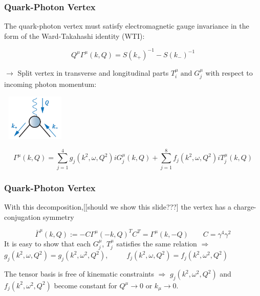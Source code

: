 \begin{frame}\frametitle{Quark-Photon Vertex}
The quark-photon vertex must satisfy electromagnetic gauge invariance in the form of the
Ward-Takahashi identity (WTI):

\begin{equation}
	Q^\mu\Gamma^\mu(k, Q)=S(k_+)^{-1}-S(k_-)^{-1}
\end{equation}

\begin{minipage}[r]{0.65\textwidth}
	$\rightarrow$ Split vertex in transverse and longitudinal parts $T_i^{\mu} \; \text{and} \; G_j^{\mu} $ with respect to incoming photon momentum:
\end{minipage}
\begin{minipage}[r]{0.30\textwidth}
	\hspace{2mm}
	\includegraphics[height=2.2cm, width=3.2cm]{Vertex.png}
\end{minipage}

\begin{equation}
	\Gamma^\mu(k,Q)=\sum_{j=1}^4 g_j(k^2, \omega, Q^2)iG^\mu_j(k, Q)+\sum_{j=1}^8 f_j(k^2, \omega, Q^2)iT^\mu_j(k, Q)
\end{equation}

\end{frame}



\begin{frame}\frametitle{Quark-Photon Vertex}
With this decomposition,[[should we show this slide???] the vertex has a charge-conjugation symmetry

\begin{equation}
	\bar{\Gamma}^\mu(k,Q):=-C\Gamma^\mu(-k,Q)^TC^T=\Gamma^\mu(k, -Q) \qquad C=\gamma^4\gamma^2
\end{equation}
\vspace{4mm}
It is easy to show that each $G_j^\mu$, $T_j^\mu$
satisfies the same relation $\Rightarrow$\\ \vspace{3mm} $g_j(k^2, \omega, Q^2)=g_j(k^2, \omega^2, Q^2)$, $\qquad$ $f_j(k^2, \omega, Q^2)=f_j(k^2, \omega^2, Q^2)$\\

\vspace{9mm}

The tensor basis  is free of kinematic constraints $\Rightarrow$
\vspace{2mm}
$g_j(k^2, \omega^2,Q^2)$ and $f_j(k^2, \omega^2,Q^2)$ become constant for $Q^\mu\to0$ or $k_\mu\to  0$.

\end{frame}


\endinput
